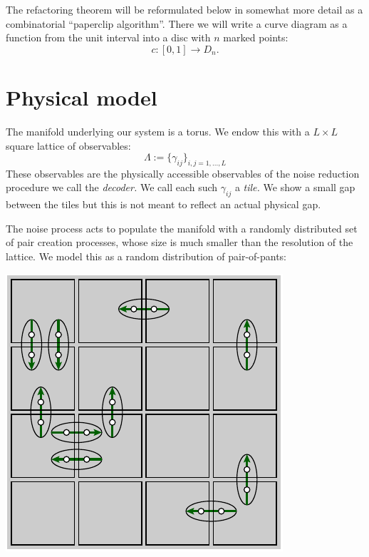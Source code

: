 \documentclass[aps, prl, letterpaper, twocolumn, superscriptaddress, notitlepage, 10pt]{revtex4-1}
\begin{document}


The refactoring theorem will be reformulated 
below in somewhat more detail as a combinatorial ``paperclip algorithm''.
There we will write a curve diagram as a function
from the unit interval into a disc with $n$ marked points:
$$
    c : [0, 1] \to D_n.  
$$

%
%

\section{Physical model}

The manifold underlying our system is a torus.
We endow this with a $L\times L$ square lattice of observables:
$$
    \Lambda := \bigl\{ \gamma_{ij} \bigr\}_{i,j=1,...,L}
$$
These observables are the physically accessible observables of
the noise reduction procedure we call the \emph{decoder.}
We call each such $\gamma_{ij}$ a \emph{tile.}
We show a small gap between the tiles but this is not meant
to reflect an actual physical gap.

The noise process acts to populate the manifold with
a randomly distributed set of pair creation processes,
whose size is much smaller than the resolution of the lattice.
We model this as a random distribution of pair-of-pants:
\begin{center}
\includegraphics[width=0.3\columnwidth ]{pic-pair-create.pdf}
\end{center}
\end{document}
